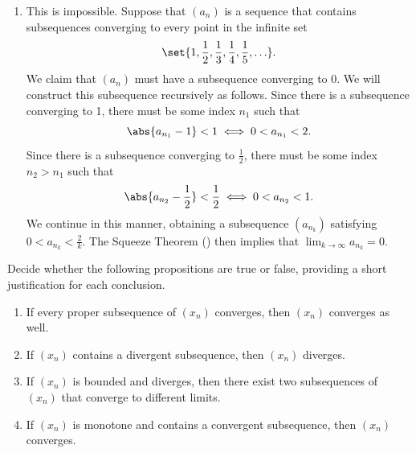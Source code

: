 \documentclass{lew98_solutions}
\begin{document}
\begin{solution}
\begin{enumerate}
        \item This is impossible. Suppose that \( (a_n) \) is a sequence that contains subsequences converging to every point in the infinite set
        \[
            \set{ 1, \frac{1}{2}, \frac{1}{3}, \frac{1}{4}, \frac{1}{5}, \ldots }.
        \]
        We claim that \( (a_n) \) must have a subsequence converging to 0. We will construct this subsequence recursively as follows. Since there is a subsequence converging to 1, there must be some index \( n_1 \) such that
        \[
            \abs{a_{n_1} - 1} < 1 \iff 0 < a_{n_1} < 2.
        \]
        Since there is a subsequence converging to \( \tfrac{1}{2} \), there must be some index \( n_2 > n_1 \) such that
        \[
            \abs{a_{n_2} - \frac{1}{2}} < \frac{1}{2} \iff 0 < a_{n_2} < 1.
        \]
        We continue in this manner, obtaining a subsequence \( (a_{n_k}) \) satisfying \( 0 < a_{n_k} < \tfrac{2}{k} \). The Squeeze Theorem () then implies that \( \lim_{k \to \infty} a_{n_k} = 0 \).
    \end{enumerate}
\end{solution}

\begin{exercise}
\label{ex:2.5.2}
    Decide whether the following propositions are true or false, providing a short justification for each conclusion.
    \begin{enumerate}
        \item If every proper subsequence of \( (x_n) \) converges, then \( (x_n) \) converges as well.

        \item If \( (x_n) \) contains a divergent subsequence, then \( (x_n) \) diverges.

        \item If \( (x_n) \) is bounded and diverges, then there exist two subsequences of \( (x_n) \) that converge to different limits.

        \item If \( (x_n) \) is monotone and contains a convergent subsequence, then \( (x_n) \) converges.
    \end{enumerate}
\end{exercise}
\end{document}
